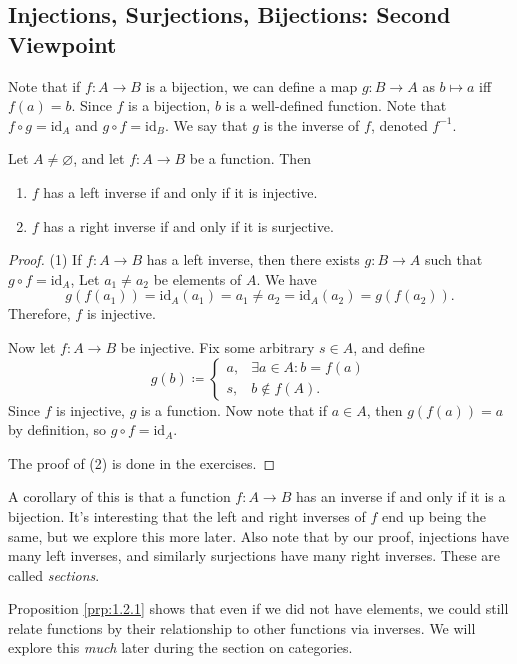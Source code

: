 \subsection{Injections, Surjections, Bijections: Second Viewpoint}
Note that if $f : A \to B$ is a bijection, we can define a map $g : B \to A$ as $b\mapsto a$ iff $f(a)=b$. Since $f$ is a bijection, $b$ is a well-defined function. Note that $f\circ g=\mathrm{id}_A$ and $g\circ f=\mathrm{id}_B$. We say that $g$ is the inverse of $f$, denoted $f^{-1}$.
\begin{proposition}\label{prp:1.2.1}
	Let $A\neq \varnothing$, and let $f : A \to B$ be a function. Then
	\begin{enumerate}
		\item $f$ has a left inverse if and only if it is injective.
		\item $f$ has a right inverse if and only if it is surjective.
	\end{enumerate}
\end{proposition}
\begin{proof}
	(1) If $f : A \to B$ has a left inverse, then there exists $g : B \to A$ such that $g\circ f=\mathrm{id}_A$, Let $a_1\neq a_2$ be elements of $A$. We have
	\[
		g(f(a_1))=\mathrm{id}_A(a_1)=a_1\neq a_2=\mathrm{id}_A(a_2)=g(f(a_2))
	.\]
	Therefore, $f$ is injective.

	Now let $f : A \to B$ be injective. Fix some arbitrary $s\in A$, and define
	\[
		g(b)\coloneqq 
		\begin{cases}
			a,&\exists a\in A:b=f(a)\\
			s,&b\notin f(A).
		\end{cases}
	\]
	Since $f$ is injective, $g$ is a function. Now note that if $a\in A$, then $g(f(a))=a$ by definition, so $g\circ f=\mathrm{id}_A$.

	The proof of (2) is done in the exercises.
\end{proof}
A corollary of this is that a function $f : A \to B$ has an inverse if and only if it is a bijection. It's interesting that the left and right inverses of $f$ end up being the same, but we explore this more later. Also note that by our proof, injections have many left inverses, and similarly surjections have many right inverses. These are called \emph{sections}.

Proposition \ref{prp:1.2.1} shows that even if we did not have elements, we could still relate functions by their relationship to other functions via inverses. We will explore this \emph{much} later during the section on categories.

